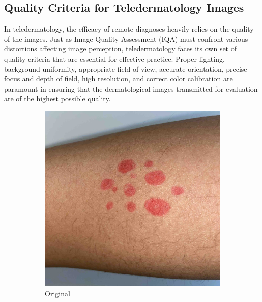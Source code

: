 \subsection{Quality Criteria for Teledermatology Images}
\label{sub:QualityCriteriaTeledermatology}
In teledermatology, the efficacy of remote diagnoses heavily relies on the quality of the images. Just as Image Quality Assessment (IQA) must confront various distortions affecting image perception, teledermatology faces its own set of quality criteria that are essential for effective practice. Proper lighting, background uniformity, appropriate field of view, accurate orientation, precise focus and depth of field, high resolution, and correct color calibration are paramount in ensuring that the dermatological images transmitted for evaluation are of the highest possible quality.
\begin{figure}[ht]
    \centering
    \begin{subfigure}[b]{0.24\textwidth}
        \includegraphics[width=\textwidth]{img/Reference.jpg}
        \caption{Original}
    \end{subfigure}
    \hfill
    \begin{subfigure}[b]{0.24\textwidth}

\end{subfigure}
\end{figure}
